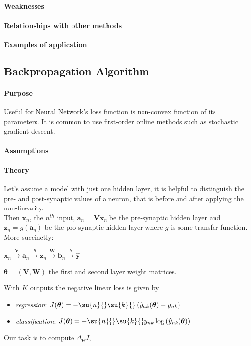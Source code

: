 \paragraph{Weaknesses}
\paragraph{Relationships with other methods}
\paragraph{Examples of application}


\subsection{Backpropagation Algorithm}
\paragraph{Purpose}
Useful for Neural Network's loss function is non-convex function of its parameters. 
It is common to use first-order online methods such as stochastic gradient descent.
\paragraph{Assumptions}
\paragraph{Theory}
Let's assume a model with just one hidden layer, it is helpful to distinguish the pre- and 
post-synaptic values of a neuron, that is before and after applying the non-linearity.\\
Then $\bm{x}_{n}$, the $n^{th}$ input, $\bm{a}_{n} = \bm{V}\bm{x}_{n}$ be the pre-synaptic hidden
layer and $\bm{z}_{n} = g(\bm{a}_{n})$ be the pro-synaptic hidden layer where $g$ is some transfer
function. More succinctly:
\begin{center}
    $\bm{x}_{n} \xrightarrow{\bm{V}} \bm{a}_{n} \xrightarrow{g} \bm{z}_{n} \xrightarrow{\bm{W}}
    \bm{b}_{n} \xrightarrow{h} \hat{\bm{y}}$
\end{center}
$\bm{\theta}=\left(\bm{V},\bm{W}\right)$ the first and second layer weight matrices.

With $K$ outputs the negative linear loss is given by
\begin{itemize}
    \item \emph{regression}: $J(\bm{\theta})=-\su{n}{}\su{k}{}\left(\hat{y}_{nk}(\bm{\theta})-y_{nk}
        \right)$
    \item \emph{classification}: $J(\bm{\theta})=-\su{n}{}\su{k}{}y_{nk}\log\left(\hat{y}_{nk}(\bm{
            \theta})\right)$
\end{itemize}
Our task is to compute $\Delta_{\bm{\theta}}J$, 

